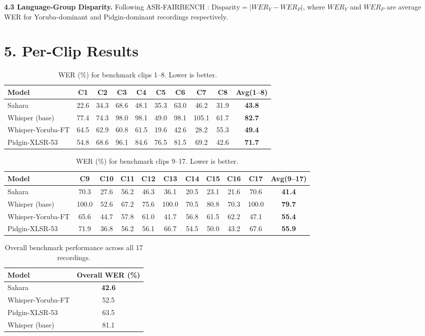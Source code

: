 \documentclass[9pt,twocolumn]{article}
\begin{document}
\textbf{4.3 Language-Group Disparity.} Following ASR-FAIRBENCH \cite{fairbench}: $\text{Disparity} = |WER_Y - WER_P|$, where $WER_Y$ and $WER_P$ are average WER for Yoruba-dominant and Pidgin-dominant recordings respectively.

\section*{5. Per-Clip Results}

\begin{table}[t]
\centering
\small
\begin{tabular}{lccccccccc}
\toprule
Model & C1 & C2 & C3 & C4 & C5 & C6 & C7 & C8 & Avg(1--8) \\
\midrule
Sahara & 22.6 & 34.3 & 68.6 & 48.1 & 35.3 & 63.0 & 46.2 & 31.9 & \textbf{43.8} \\
Whisper (base) & 77.4 & 74.3 & 98.0 & 98.1 & 49.0 & 98.1 & 105.1 & 61.7 & \textbf{82.7} \\
Whisper-Yoruba-FT & 64.5 & 62.9 & 60.8 & 61.5 & 19.6 & 42.6 & 28.2 & 55.3 & \textbf{49.4} \\
Pidgin-XLSR-53 & 54.8 & 68.6 & 96.1 & 84.6 & 76.5 & 81.5 & 69.2 & 42.6 & \textbf{71.7} \\
\bottomrule
\end{tabular}
\caption{WER (\%) for benchmark clips 1--8. Lower is better.}
\end{table}

\begin{table}[t]
\centering
\small
\begin{tabular}{lcccccccccc}
\toprule
Model & C9 & C10 & C11 & C12 & C13 & C14 & C15 & C16 & C17 & Avg(9--17) \\
\midrule
Sahara & 70.3 & 27.6 & 56.2 & 46.3 & 36.1 & 20.5 & 23.1 & 21.6 & 70.6 & \textbf{41.4} \\
Whisper (base) & 100.0 & 52.6 & 67.2 & 75.6 & 100.0 & 70.5 & 80.8 & 70.3 & 100.0 & \textbf{79.7} \\
Whisper-Yoruba-FT & 65.6 & 44.7 & 57.8 & 61.0 & 41.7 & 56.8 & 61.5 & 62.2 & 47.1 & \textbf{55.4} \\
Pidgin-XLSR-53 & 71.9 & 36.8 & 56.2 & 56.1 & 66.7 & 54.5 & 50.0 & 43.2 & 67.6 & \textbf{55.9} \\
\bottomrule
\end{tabular}
\caption{WER (\%) for benchmark clips 9--17. Lower is better.}
\end{table}

\begin{table}[h]
\centering
\small
\begin{tabular}{lc}
\toprule
Model & Overall WER (\%) \\
\midrule
Sahara & \textbf{42.6} \\
Whisper-Yoruba-FT & 52.5 \\
Pidgin-XLSR-53 & 63.5 \\
Whisper (base) & 81.1 \\
\bottomrule
\end{tabular}
\caption{Overall benchmark performance across all 17 recordings.}
\end{table}
\end{document}
